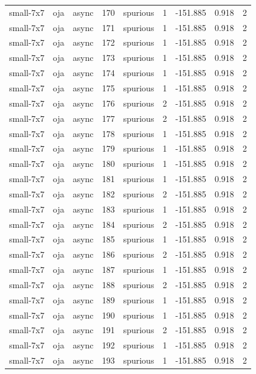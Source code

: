 \begin{tabular}{lllrlrrrr}
small-7x7 & oja & async & 170 & spurious & 1 & -151.885 & 0.918 & 2 \\
small-7x7 & oja & async & 171 & spurious & 1 & -151.885 & 0.918 & 2 \\
small-7x7 & oja & async & 172 & spurious & 1 & -151.885 & 0.918 & 2 \\
small-7x7 & oja & async & 173 & spurious & 1 & -151.885 & 0.918 & 2 \\
small-7x7 & oja & async & 174 & spurious & 1 & -151.885 & 0.918 & 2 \\
small-7x7 & oja & async & 175 & spurious & 1 & -151.885 & 0.918 & 2 \\
small-7x7 & oja & async & 176 & spurious & 2 & -151.885 & 0.918 & 2 \\
small-7x7 & oja & async & 177 & spurious & 2 & -151.885 & 0.918 & 2 \\
small-7x7 & oja & async & 178 & spurious & 1 & -151.885 & 0.918 & 2 \\
small-7x7 & oja & async & 179 & spurious & 1 & -151.885 & 0.918 & 2 \\
small-7x7 & oja & async & 180 & spurious & 1 & -151.885 & 0.918 & 2 \\
small-7x7 & oja & async & 181 & spurious & 1 & -151.885 & 0.918 & 2 \\
small-7x7 & oja & async & 182 & spurious & 2 & -151.885 & 0.918 & 2 \\
small-7x7 & oja & async & 183 & spurious & 1 & -151.885 & 0.918 & 2 \\
small-7x7 & oja & async & 184 & spurious & 2 & -151.885 & 0.918 & 2 \\
small-7x7 & oja & async & 185 & spurious & 1 & -151.885 & 0.918 & 2 \\
small-7x7 & oja & async & 186 & spurious & 2 & -151.885 & 0.918 & 2 \\
small-7x7 & oja & async & 187 & spurious & 1 & -151.885 & 0.918 & 2 \\
small-7x7 & oja & async & 188 & spurious & 2 & -151.885 & 0.918 & 2 \\
small-7x7 & oja & async & 189 & spurious & 1 & -151.885 & 0.918 & 2 \\
small-7x7 & oja & async & 190 & spurious & 1 & -151.885 & 0.918 & 2 \\
small-7x7 & oja & async & 191 & spurious & 2 & -151.885 & 0.918 & 2 \\
small-7x7 & oja & async & 192 & spurious & 1 & -151.885 & 0.918 & 2 \\
small-7x7 & oja & async & 193 & spurious & 1 & -151.885 & 0.918 & 2 \\

\end{tabular}
